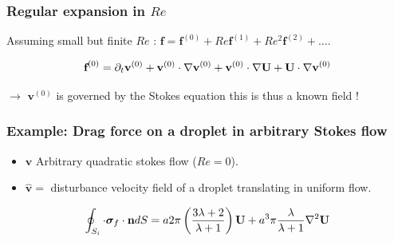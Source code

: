 \documentclass{sintefbeamer}
\begin{document}
\begin{frame}
  \frametitle{Regular expansion in $Re$ }

  Assuming small but finite $Re$ : $\textbf{f} = \textbf{f}^{(0)} + Re  \textbf{f}^{(1)} + Re^2  \textbf{f}^{(2)} + \ldots$. 

  
  \begin{equation*}
    \textbf{f}^{(0)}
    =
        \partial_t \textbf{v}^{(0)}
        + \textbf{v}^{(0)}\cdot \mathbf{\nabla}\textbf{v}^{(0)} 
        +  \textbf{v}^{(0)}\cdot \mathbf{\nabla}\textbf{U} 
        +  \textbf{U}\cdot \mathbf{\nabla}\textbf{v}^{(0)}
  \end{equation*}

  $\to$ $\textbf{v}^{(0)}$ is governed by the Stokes equation this is thus a known field ! 
\end{frame}
\begin{frame}
  \frametitle{Example: Drag force on a droplet in arbitrary Stokes flow}
  \begin{itemize}
    \item $\textbf{v}$ Arbitrary quadratic stokes flow ($Re=0$).  
    \item $\hat{\textbf{v}} = $ disturbance velocity field of a droplet translating in uniform flow. 
  \end{itemize}

  \begin{equation}
    \oint_{S_{i}} \cdot  \bm\sigma_f \cdot \textbf{n} dS
    =
    a 2\pi \left(
      \frac{3\lambda +2 }{\lambda +1} 
    \right) \textbf{U}
    + 
    a^3 \pi \frac{\lambda}{\lambda +1}
    \mathbf{\nabla}^2 \textbf{U}
  \end{equation}
\end{frame}
\end{document}
